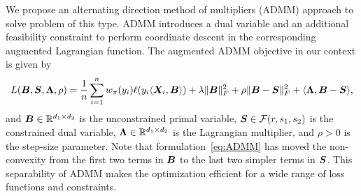 \documentclass[11pt]{article}
\theoremstyle{plain}
\theoremstyle{definition}
\begin{document}
We propose an alternating direction method of multipliers (ADMM) approach to solve problem of this type. ADMM introduces a dual variable and an additional feasibility constraint to perform coordinate descent in the corresponding augmented Lagrangian function. The augmented ADMM objective in our context is given by
\begin{equation}\label{eq:ADMM}
L(\bm B,\bm S,\bm{\Lambda},\rho)={1\over n}\sum_{i=1}^nw_\pi(y_i)\ell(y_i\langle \bm X_i,\bm B \rangle) + \lambda\lVert\bm B\rVert_F^2+\rho\lVert\bm B-\bm S\rVert_F^2+\langle \bm{\Lambda}, \bm B-\bm S\rangle,
\end{equation}
and $\bm B\in \mathbb{R}^{d_1\times d_2}$ is the unconstrained primal variable, $\bm S\in\mathcal{F}(r,s_1,s_2)$ is the constrained dual variable, $\bm{\Lambda}\in\mathbb{R}^{d_1\times d_2}$ is the  Lagrangian multiplier, and $\rho>0$ is the step-size parameter. Note that formulation~\eqref{eq:ADMM} has moved the non-convexity from the first two terms in $\bm B$ to the last two simpler terms in $\bm S$. This separability of ADMM makes the optimization efficient for a wide range of loss functions and constraints. 
\end{document}
